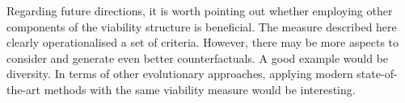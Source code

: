 \documentclass[./../../paper.tex]{subfiles}
\begin{document}
Regarding future directions, it is worth pointing out whether employing other components of the viability structure is beneficial. The measure described here clearly operationalised a set of criteria. However, there may be more aspects to consider and generate even better counterfactuals. A good example would be diversity. In terms of other evolutionary approaches, applying modern state-of-the-art methods with the same viability measure would be interesting.

\end{document}
